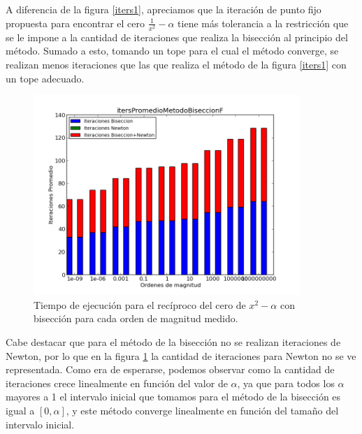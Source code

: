 A diferencia de la figura \ref{iters1}, apreciamos que la iteración de punto fijo propuesta para encontrar el cero $\frac{1}{x^2} - \alpha$ tiene más tolerancia a la restricción que se le impone a la cantidad de iteraciones que realiza la bisección al principio del método. Sumado a esto, tomando un tope para el cual el método converge, se realizan menos iteraciones que las que realiza el método de la figura \ref{iters1} con un tope adecuado.


\begin{figure}[H]
  \centering
    \includegraphics[width=0.9\textwidth]{../data/itersPromedioMetodoBiseccionF.png}
    \caption{Tiempo de ejecución para el recíproco del cero de ${x^2} - \alpha$ con bisección para cada orden de magnitud medido.}
    \label{iters3}
\end{figure}

Cabe destacar que para el método de la bisección no se realizan iteraciones de Newton, por lo que en la figura \ref{iters3} la cantidad de iteraciones para Newton no se ve representada. Como era de esperarse, podemos observar como la cantidad de iteraciones crece linealmente en función del valor de $\alpha$, ya que para todos los $\alpha$ mayores a 1 el intervalo inicial que tomamos para el método de la bisección es igual a $[0,\alpha]$, y este método converge linealmente en función del tamaño del intervalo inicial.





